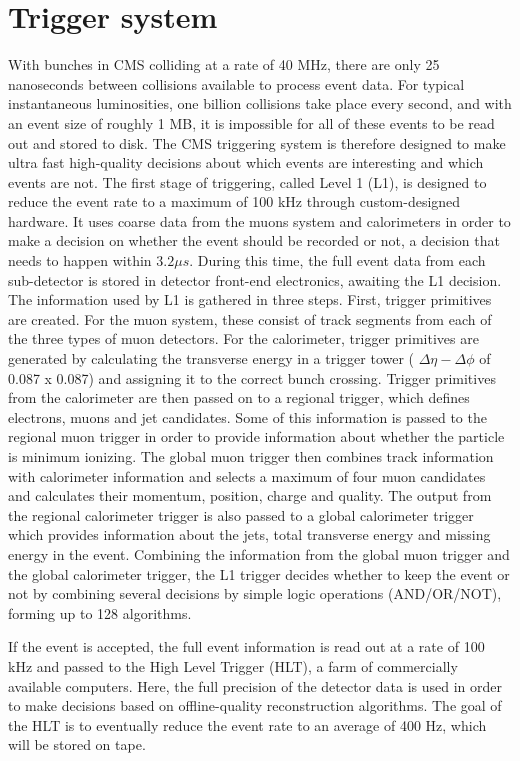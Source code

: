 \section{Trigger system}
With bunches in CMS colliding at a rate of 40 MHz, there are only 25 nanoseconds between collisions available to process event data. For typical instantaneous luminosities, one billion collisions take place every second, and with an event size of roughly 1 MB, it is impossible for all of these events to be read out and stored to disk. The CMS triggering system is therefore designed to make ultra fast high-quality decisions about which events are interesting and which events are not.
The first stage of triggering, called Level 1 (L1), is designed to reduce the event rate to a maximum of 100 kHz through custom-designed hardware. It uses coarse data from the muons system and calorimeters in order to make a decision on whether the event should be recorded or not, a decision that needs to happen within $3.2 \mu s$. During this time, the full event data from each sub-detector is stored in detector front-end electronics, awaiting the L1 decision. The information used by L1 is gathered in three steps. First, trigger primitives are created. For the muon system, these consist of track segments from each of the three types of muon detectors. For the calorimeter, trigger primitives are generated by calculating the transverse energy in a trigger tower ( $\Delta \eta- \Delta \phi$ of 0.087 x 0.087) and assigning it to the correct bunch crossing. Trigger primitives from the calorimeter are then passed on to a regional trigger, which defines electrons, muons and jet candidates. Some of this information is passed to the regional muon trigger in order to provide information about whether the particle is minimum ionizing. The global muon trigger then combines track information with calorimeter information and selects a maximum of four muon candidates and calculates their momentum, position, charge and quality. The output from the regional calorimeter trigger is also passed to a global calorimeter trigger which provides information about the jets, total transverse energy and missing energy in the event. Combining the information from the global muon trigger and the global calorimeter trigger, the L1 trigger decides whether to keep the event or not by combining several decisions by simple logic operations (AND/OR/NOT), forming up to 128 algorithms.

If the event is accepted, the full event information is read out at a rate of 100 kHz and passed to the High Level Trigger (HLT), a farm of commercially available computers. Here, the full precision of the detector data is used in order to make decisions based on offline-quality reconstruction algorithms. The goal of the HLT is to eventually reduce the event rate to an average of 400 Hz, which will be stored on tape.
